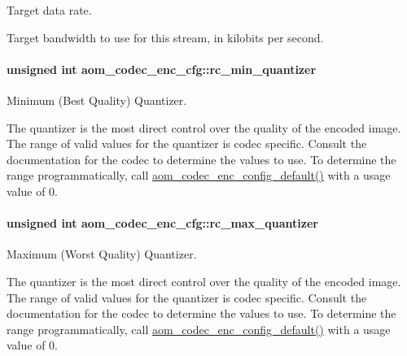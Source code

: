 Target data rate. 

Target bandwidth to use for this stream, in kilobits per second. 
\paragraph[{\texorpdfstring{rc\+\_\+min\+\_\+quantizer}{rc_min_quantizer}}]{\setlength{\rightskip}{0pt plus 5cm}unsigned int aom\+\_\+codec\+\_\+enc\+\_\+cfg\+::rc\+\_\+min\+\_\+quantizer}\hypertarget{structaom__codec__enc__cfg_aa5c6cede8c820ef29fc3c106aa1227eb}{}\label{structaom__codec__enc__cfg_aa5c6cede8c820ef29fc3c106aa1227eb}


Minimum (Best Quality) Quantizer. 

The quantizer is the most direct control over the quality of the encoded image. The range of valid values for the quantizer is codec specific. Consult the documentation for the codec to determine the values to use. To determine the range programmatically, call \hyperlink{group__encoder_gabe456ab6f99bdebc47018779b75d2521}{aom\+\_\+codec\+\_\+enc\+\_\+config\+\_\+default()} with a usage value of 0. 
\paragraph[{\texorpdfstring{rc\+\_\+max\+\_\+quantizer}{rc_max_quantizer}}]{\setlength{\rightskip}{0pt plus 5cm}unsigned int aom\+\_\+codec\+\_\+enc\+\_\+cfg\+::rc\+\_\+max\+\_\+quantizer}\hypertarget{structaom__codec__enc__cfg_a8f8851455e06db026022d4b01671b122}{}\label{structaom__codec__enc__cfg_a8f8851455e06db026022d4b01671b122}


Maximum (Worst Quality) Quantizer. 

The quantizer is the most direct control over the quality of the encoded image. The range of valid values for the quantizer is codec specific. Consult the documentation for the codec to determine the values to use. To determine the range programmatically, call \hyperlink{group__encoder_gabe456ab6f99bdebc47018779b75d2521}{aom\+\_\+codec\+\_\+enc\+\_\+config\+\_\+default()} with a usage value of 0. 

